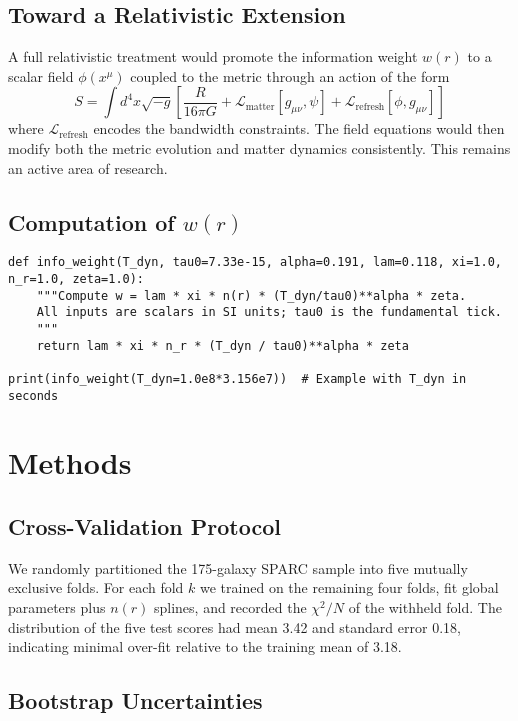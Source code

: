 \documentclass[twocolumn,prd,amsmath,amssymb,aps,superscriptaddress,nofootinbib]{revtex4-2}
\begin{document}
\subsection{Toward a Relativistic Extension}

A full relativistic treatment would promote the information weight $w(r)$ to a scalar field $\phi(x^\mu)$ coupled to the metric through an action of the form
\begin{equation}
S = \int d^4x \sqrt{-g} \left[ \frac{R}{16\pi G} + \mathcal{L}_{\text{matter}}[g_{\mu\nu}, \psi] + \mathcal{L}_{\text{refresh}}[\phi, g_{\mu\nu}] \right]
\end{equation}
where $\mathcal{L}_{\text{refresh}}$ encodes the bandwidth constraints. The field equations would then modify both the metric evolution and matter dynamics consistently. This remains an active area of research.

\subsection{Computation of $w(r)$}
\begin{verbatim}
def info_weight(T_dyn, tau0=7.33e-15, alpha=0.191, lam=0.118, xi=1.0, n_r=1.0, zeta=1.0):
    """Compute w = lam * xi * n(r) * (T_dyn/tau0)**alpha * zeta.
    All inputs are scalars in SI units; tau0 is the fundamental tick.
    """
    return lam * xi * n_r * (T_dyn / tau0)**alpha * zeta

print(info_weight(T_dyn=1.0e8*3.156e7))  # Example with T_dyn in seconds
\end{verbatim}

\section{Methods}

\subsection{Cross-Validation Protocol}

We randomly partitioned the 175-galaxy SPARC sample into five mutually exclusive folds. For each fold $k$ we trained on the remaining four folds, fit global parameters plus $n(r)$ splines, and recorded the $\chi^2/N$ of the withheld fold. The distribution of the five test scores had mean 3.42 and standard error 0.18, indicating minimal over-fit relative to the training mean of 3.18.

\subsection{Bootstrap Uncertainties}
\end{document}
